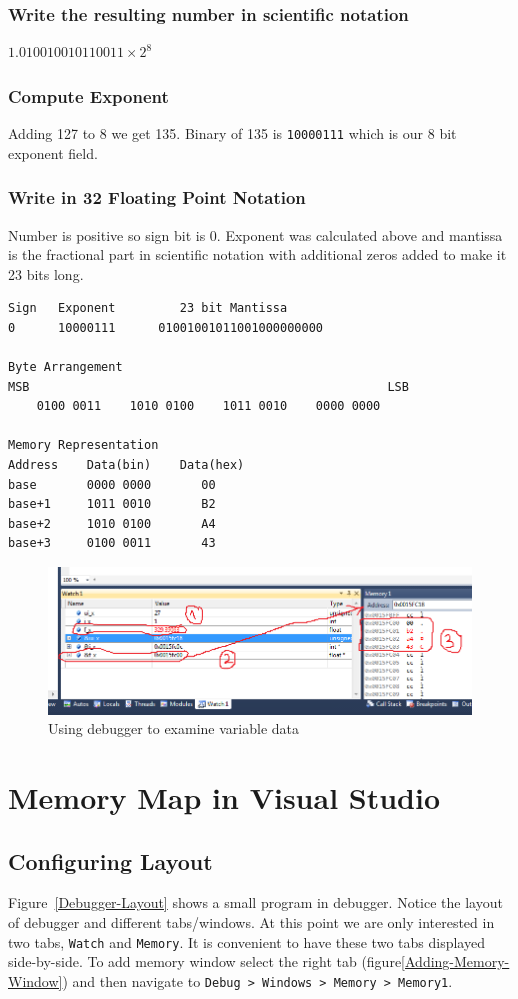 \documentclass[12pt,a4paper]{article}
\begin{document}
\subsubsection{Write the resulting number in scientific notation}
$1.010010010110011 \times 2^8$
\subsubsection{Compute Exponent}
Adding 127 to 8 we get 135. Binary of 135 is \verb|10000111| which is our 8 bit exponent field.
\subsubsection{Write in 32 Floating Point Notation}
Number is positive so sign bit is 0. Exponent was calculated above and mantissa is the fractional part in scientific notation with additional zeros added to make it 23 bits long.
\begin{verbatim}
Sign   Exponent         23 bit Mantissa
0      10000111      01001001011001000000000

Byte Arrangement
MSB                                                  LSB
    0100 0011    1010 0100    1011 0010    0000 0000

Memory Representation
Address    Data(bin)    Data(hex)
base       0000 0000       00
base+1     1011 0010       B2
base+2     1010 0100       A4
base+3     0100 0011       43
\end{verbatim}

\begin{figure}[H]
\centering
\label{Floating-Point-Example}
\includegraphics[scale=0.65]{FloatingPointExample.png}
\caption{Using debugger to examine variable data}
\end{figure}

\section{Memory Map in Visual Studio}
\subsection{Configuring Layout}
Figure~\ref{Debugger-Layout} shows a small program in debugger. Notice the layout of debugger and different tabs/windows. At this point we are only interested in two tabs, \verb|Watch| and \verb|Memory|. It is convenient to have these two tabs displayed side-by-side. To add memory window select the right tab (figure\ref{Adding-Memory-Window}) and then navigate to \verb|Debug > Windows > Memory > Memory1|.
\end{document}
